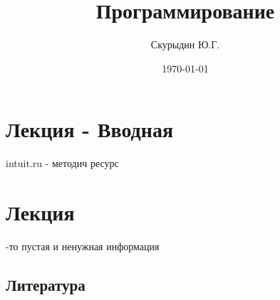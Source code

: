 \documentclass[a4paper, 12pt]{article}
\title{Программирование}
\author{Скурыдин Ю.Г.}
\date{\today}
\begin{document}
\sffamily
\maketitle
\section{Лекция - Вводная}
intuit.ru - методич ресурс\\

\section{Лекция }

{-то пустая и ненужная информация}








\newpage
\subsection*{Литература}
 
\end{document}
